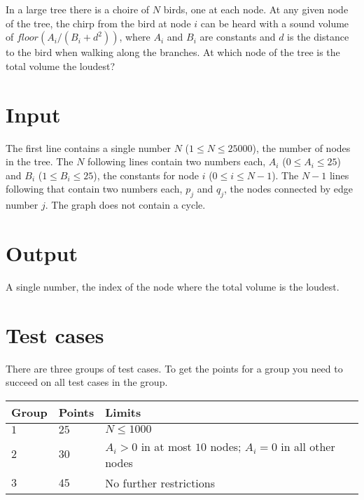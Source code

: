 In a large tree there is a choire of $N$ birds, one at each node. At any given node of the tree, the chirp from the bird at node $i$ can be heard with a sound volume of $floor(A_i / (B_i + d^2))$, where $A_i$ and $B_i$ are constants and $d$ is the distance to the bird when walking along the branches. At which node of the tree is the total volume the loudest?

\section*{Input}
The first line contains a single number $N$ ($1 \le N \le 25000$), the number of nodes in the tree. The $N$ following lines contain two numbers each, $A_i$ ($0 \le A_i \le 25$) and $B_i$ ($1 \le B_i \le 25$), the constants for node $i$ ($0 \le i \le N-1$). The $N-1$ lines following that contain two numbers each, $p_j$ and $q_j$, the nodes connected by edge number $j$. The graph does not contain a cycle.

\section*{Output}
A single number, the index of the node where the total volume is the loudest.

\section*{Test cases}
There are three groups of test cases. To get the points for a group you need to succeed on all test cases in the group.

\noindent
\begin{tabular}{| l | l | l |}
  \hline
  Group & Points & Limits                                                      \\ \hline
  $1$   & $25$   & $N \le 1000$                                                \\ \hline
  $2$   & $30$   & $A_i > 0$ in at most $10$ nodes; $A_i=0$ in all other nodes \\ \hline
  $3$   & $45$   & No further restrictions                                     \\ \hline
\end{tabular}
